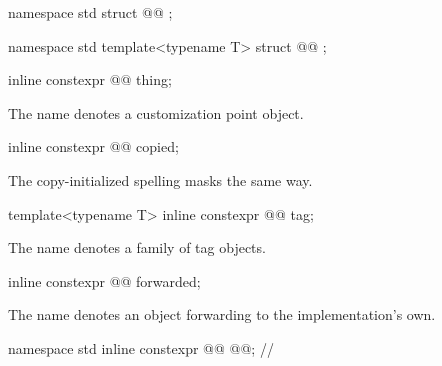 \begin{codeblock}
namespace std {
  struct @@ {};
}
\end{codeblock}

\begin{codeblock}
namespace std {
  template<typename T>
  struct @@ {};
}
\end{codeblock}

%
\begin{itemdecl}
inline constexpr @@ thing;
\end{itemdecl}

\begin{itemdescr}
\pnum
\remarks
The name  denotes a customization point object.
\end{itemdescr}

%
\begin{itemdecl}
inline constexpr @@ copied;
\end{itemdecl}

\begin{itemdescr}
\pnum
\remarks
The copy-initialized spelling masks the same way.
\end{itemdescr}

%
\begin{itemdecl}
template<typename T>
  inline constexpr @@ tag;
\end{itemdecl}

\begin{itemdescr}
\pnum
\remarks
The name  denotes a family of tag objects.
\end{itemdescr}

%
\begin{itemdecl}
inline constexpr @@ forwarded;
\end{itemdecl}

\begin{itemdescr}
\pnum
\remarks
The name  denotes an object forwarding to the implementation's own.
\end{itemdescr}

\begin{codeblock}
namespace std {
  inline constexpr @@ @@; // \expos
}
\end{codeblock}
